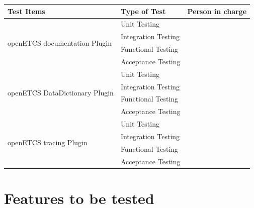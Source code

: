\begin{center}
\begin{longtable}[H]{|p{6cm}|p{4cm}|p{4cm}|}\hline
\textbf{Test Items} & \textbf{Type of Test} & \textbf{Person in charge}\\\hline
\multirow{4}{*}{openETCS documentation Plugin} & Unit Testing & \\\cline{2-3} & Integration Testing & \\\cline{2-3} & Functional Testing & \\\cline{2-3} & Acceptance Testing & \\\hline
\multirow{4}{*}{openETCS DataDictionary Plugin} & Unit Testing & \\\cline{2-3} & Integration Testing & \\\cline{2-3} & Functional Testing & \\\cline{2-3} & Acceptance Testing & \\\hline
\multirow{4}{*}{openETCS tracing Plugin} & Unit Testing & \\\cline{2-3} & Integration Testing & \\\cline{2-3} & Functional Testing & \\\cline{2-3} & Acceptance Testing & \\\hline
\end{longtable}
\end{center}

\section{Features to be tested}
\label{sec:features_test}

